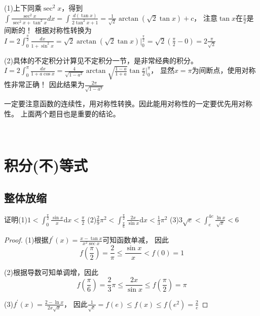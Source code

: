 \begin{solution}
  (1)上下同乘$\sec^2 x$，得到$\int \frac{\sec^2 x}{\sec^2 x + \tan ^2 x}dx = \int \frac{d(\tan x)}{2 \tan^2 x + 1} = \frac{1}{\sqrt{2}} \arctan (\sqrt{2} \tan x) + c$，
  注意$\tan x$在$\frac{\pi}{2}$是间断的！
  根据对称性转换为$I = 2 \int_0^{\frac{\pi}{2}} \frac{dx}{1 + \sin^2 x} = \sqrt{2} \arctan (\sqrt{2} \tan x)|^{\frac{\pi}{2}}_0 = \sqrt{2}(\frac{\pi}{2} - 0) =  2\frac{\pi}{\sqrt{2}}$

  (2)具体的不定积分计算见不定积分一节，是非常经典的积分。
  $I = 2 \int_0^{\pi} \frac{dx}{1 + a \cos x} = \frac{4}{\sqrt{1 - a^2}} \arctan \sqrt{\frac{1 - a}{1 + a}}\tan \frac{x}{2}|_0^{\pi}$，
  显然$x = \pi$为间断点，使用对称性非常正确！
  因此结果为$\frac{2\pi}{\sqrt{1 - a^2}}$
\end{solution}

\begin{note}
  一定要注意函数的连续性，用对称性转换。因此能用对称性的一定要优先用对称性。
  上面两个题目也是重要的结论。
\end{note}

~



\section{积分(不)等式}

\subsection{整体放缩}

\begin{exercise}[几个简单积分放缩]
  证明(1)$1 < \int_0^{\frac{\pi}{2}} \frac{\sin x}{x} \mathrm{d} x < \frac{\pi}{2}$
  (2)$\frac{2}{9}\pi^2 < \int_{\frac{\pi}{6}}^{\frac{\pi}{2}} \frac{2x}{ \sin x}\mathrm{d} x < \frac{1}{3}\pi^2$
  (3)$3 \sqrt{e} < \int_e^{4e} \frac{\ln x}{\sqrt{x}} < 6$
\end{exercise}

\begin{proof}
  (1)根据$f^{\prime}(x) = \frac{x - \tan x}{x^2 \sec x }$可知函数单减，
  因此
  \begin{equation*}
    f \left( \frac{\pi}{2} \right) = \frac{2}{\pi} \leq \frac{\sin x}{x} < f(0) = 1
  \end{equation*}

  (2)根据导数可知单调增，因此
  \begin{equation*}
    f \left( \frac{\pi}{6} \right) = \frac{2}{3}\pi \leq \frac{2x}{\sin x} \leq f \left( \frac{\pi}{2} \right) = \pi
  \end{equation*}

  (3)$f^{\prime}(x) = \frac{2 - \ln x}{2x \sqrt{x}}$，
  因此$\frac{1}{\sqrt{e}} = f(e) \leq f(x) \leq f(e^2) = \frac{2}{e}$
\end{proof}


